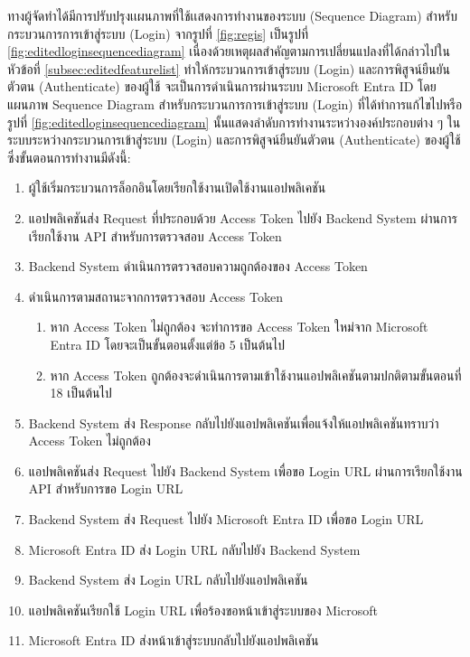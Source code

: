 \documentclass[14pt,oneside,openright,a4paper]{cpe-thai-project}
\begin{document}
\newpage

  ทางผู้จัดทําได้มีการปรับปรุงเเผนภาพที่ใช้เเสดงการทำงานของระบบ (Sequence Diagram) สำหรับกระบวนการการเข้าสู่ระบบ (Login) จากรูปที่ \ref{fig:regis} เป็นรูปที่ \ref{fig:editedloginsequencediagram} เนื่องด้วยเหตุผลสําคัญตามการเปลี่ยนแปลงที่ได้กล่าวไปในหัวข้อที่ \ref{subsec:editedfeaturelist} ทำให้กระบวนการเข้าสู่ระบบ (Login) และการพิสูจน์ยืนยันตัวตน (Authenticate) ของผู้ใช้
  จะเป็นการดําเนินการผ่านระบบ Microsoft Entra ID โดยแผนภาพ Sequence Diagram สำหรับกระบวนการการเข้าสู่ระบบ (Login) ที่ได้ทำการแก้ไขไปหรือรูปที่ \ref{fig:editedloginsequencediagram} นั้นแสดงลำดับการทำงานระหว่างองค์ประกอบต่าง ๆ ในระบบระหว่างกระบวนการเข้าสู่ระบบ (Login) และการพิสูจน์ยืนยันตัวตน (Authenticate) ของผู้ใช้ ซึ่งขั้นตอนการทำงานมีดังนี้:
  \begin{enumerate}
    \item ผู้ใช้เริ่มกระบวนการล็อกอินโดยเรียกใช้งานเปิดใช้งานแอปพลิเคชัน
    \item แอปพลิเคชันส่ง Request ที่ประกอบด้วย Access Token ไปยัง Backend System ผ่านการเรียกใช้งาน API สำหรับการตรวจสอบ Access Token
    \item Backend System ดำเนินการตรวจสอบความถูกต้องของ Access Token
    \item ดำเนินการตามสถานะจากการตรวจสอบ Access Token
      \begin{enumerate}
        \item หาก Access Token ไม่ถูกต้อง จะทำการขอ Access Token ใหม่จาก Microsoft Entra ID โดยจะเป็นขั้นตอนตั้งแต่ข้อ 5 เป็นต้นไป 
        \item หาก Access Token ถูกต้องจะดำเนินการตามเข้าใช้งานแอปพลิเคชันตามปกติตามขั้นตอนที่ 18 เป็นต้นไป
      \end{enumerate}
    \item Backend System ส่ง Response กลับไปยังแอปพลิเคชันเพื่อแจ้งให้แอปพลิเคชันทราบว่า Access Token ไม่ถูกต้อง
    \item แอปพลิเคชันส่ง Request ไปยัง Backend System เพื่อขอ Login URL ผ่านการเรียกใช้งาน API สำหรับการขอ Login URL
    \item Backend System ส่ง Request ไปยัง Microsoft Entra ID เพื่อขอ Login URL
    \item Microsoft Entra ID ส่ง Login URL กลับไปยัง Backend System
    \item Backend System ส่ง Login URL กลับไปยังแอปพลิเคชัน
    \item แอปพลิเคชันเรียกใช้ Login URL เพื่อร้องขอหน้าเข้าสู่ระบบของ Microsoft
    \item Microsoft Entra ID ส่งหน้าเข้าสู่ระบบกลับไปยังแอปพลิเคชัน

\end{enumerate}
\end{document}
